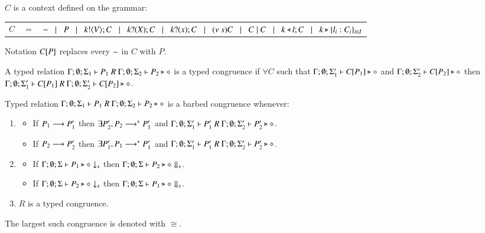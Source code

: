 \begin{definition}[Context]
	$C$ is a context defined on the grammar:

	\begin{tabular}{rcl}
		$C$ &$=$& $- \;\;\;|\;\;\; P \;\;\;|\;\;\; k ! \langle V \rangle ; C \;\;\;|\;\;\; k ? (X) ; C \;\;\;|\;\;\; k ? (x) ; C \;\;\;|\;\;\; (\nu\ s) C \;\;\;|\;\;\; C \;|\; C \;\;\;|\;\;\; k \triangleleft l ; C \;\;\;|\;\;\; k \triangleright \{l_i:C_i\}_{i \in I}$
	\end{tabular}
	Notation $C[P]$ replaces every $-$ in $C$ with $P$.
\end{definition}

\begin{definition}
	A typed relation $\Gamma;\emptyset;\Sigma_1 \vdash P_1\ R\ \Gamma; \emptyset; \Sigma_2 \vdash P_2 \triangleright \diamond$
	is a typed congruence if
	$\forall C$ such that $\Gamma;\emptyset;\Sigma_1' \vdash C[P_1] \triangleright \diamond$ and
	$\Gamma;\emptyset;\Sigma_2' \vdash C[P_2] \triangleright \diamond$ then
	$\Gamma;\emptyset;\Sigma_1' \vdash C[P_1]\ R\ \Gamma; \emptyset; \Sigma_2' \vdash C[P_2] \triangleright \diamond$.
\end{definition}

\begin{definition}
	Typed relation $\Gamma; \emptyset; \Sigma_1 \vdash P_1 \ R\ \Gamma; \emptyset; \Sigma_2 \vdash P_2 \triangleright \diamond$ is a barbed congruence
	whenever:
	\begin{enumerate}
		\item
		\begin{itemize}
			\item	If $P_1 \longrightarrow P_1'$ then $\exists P_2', P_2 \longrightarrow^* P_1'$ and $\Gamma; \emptyset; \Sigma_1' \proves P_1'\ R\ \Gamma; \emptyset; \Sigma_2' \proves P_2' \hastype \Proc$.
			\item	If $P_2 \longrightarrow P_2'$ then $\exists P_1', P_1 \longrightarrow^* P_1'$ and $\Gamma; \emptyset; \Sigma_1' \proves P_1'\ R\ \Gamma; \emptyset; \Sigma_2' \proves P_2' \hastype \Proc$.
		\end{itemize}
		\item
		\begin{itemize}
			\item	If $\Gamma;\emptyset;\Sigma \vdash P_1 \triangleright \diamond \downarrow_{s}$ then $\Gamma;\emptyset;\Sigma \vdash P_2 \triangleright \diamond \Downarrow_{s}$.
			\item	If $\Gamma;\emptyset;\Sigma \vdash P_2 \triangleright \diamond \downarrow_{s}$ then $\Gamma;\emptyset;\Sigma \vdash P_1 \triangleright \diamond \Downarrow_{s}$.
		\end{itemize}
		\item	$R$ is a typed congruence.
	\end{enumerate}
	The largest such congruence is denoted with $\cong$.
\end{definition}


